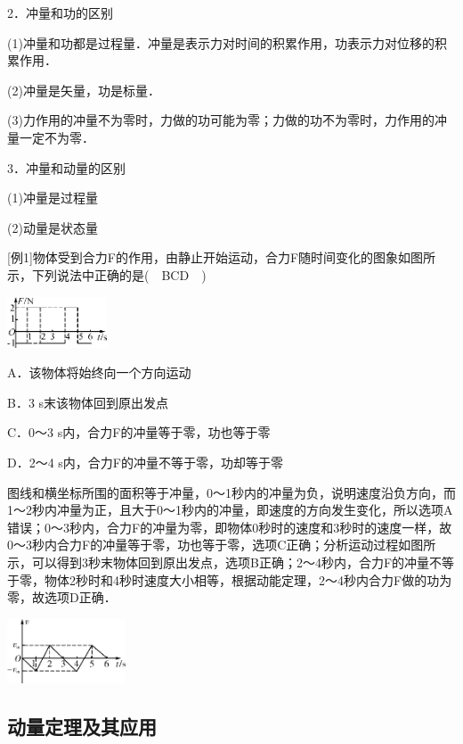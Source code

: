 \documentclass[cn,10.5pt,chinese,mac,chinesefont=founder]{elegantbook}
\begin{document}
2．冲量和功的区别

(1)冲量和功都是过程量．冲量是表示力对时间的积累作用，功表示力对位移的积累作用．

(2)冲量是矢量，功是标量．

(3)力作用的冲量不为零时，力做的功可能为零；力做的功不为零时，力作用的冲量一定不为零．

3．冲量和动量的区别

(1)冲量是过程量

(2)动量是状态量

{[}例1{]}物体受到合力F的作用，由静止开始运动，合力F随时间变化的图象如图所示，下列说法中正确的是(　BCD　)

\begin{center}\includegraphics[width=1.17014in,height=0.59444in]{media/image248.png}\end{center}

A．该物体将始终向一个方向运动

B．3 s末该物体回到原出发点

C．0～3 s内，合力F的冲量等于零，功也等于零

D．2～4 s内，合力F的冲量不等于零，功却等于零
\begin{solution}
	图线和横坐标所围的面积等于冲量，0～1秒内的冲量为负，说明速度沿负方向，而1～2秒内冲量为正，且大于0～1秒内的冲量，即速度的方向发生变化，所以选项A错误；0～3秒内，合力F的冲量为零，即物体0秒时的速度和3秒时的速度一样，故0～3秒内合力F的冲量等于零，功也等于零，选项C正确；分析运动过程如图所示，可以得到3秒末物体回到原出发点，选项B正确；2～4秒内，合力F的冲量不等于零，物体2秒时和4秒时速度大小相等，根据动能定理，2～4秒内合力F做的功为零，故选项D正确．
\end{solution}

\begin{center}\includegraphics[width=1.38681in,height=0.75486in]{media/image249.png}\end{center}
\newpage
\subsection{动量定理及其应用}
\end{document}
